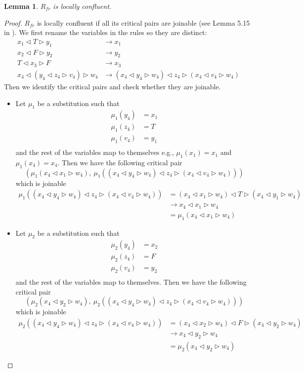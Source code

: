 \documentclass[a4paper,twoside,openright]{report}
\newcommand{\lef}{\ensuremath{\triangleleft}}
\newcommand{\rig}{\ensuremath{\triangleright}}
\newtheorem{lem}[theorem]{Lemma}
\begin{document}
\begin{lem}
$R_{fr}$ is locally confluent.
\end{lem}
\begin{proof}
$R_{fr}$ is locally confluent if all its critical pairs are joinable (see Lemma 5.15 in \cite{rewriting}). We first rename the variables in the rules so they are distinct:
\begin{align*}
x_1\lef T\rig y_1 &\to x_1\\
x_2\lef F\rig y_2 &\to y_2\\
T\lef x_3\rig F &\to x_3\\
x_4\lef(y_4\lef z_4\rig v_4)\rig w_4 &\to (x_4\lef y_4\rig w_4)\lef z_4\rig(x_4\lef v_4\rig w_4)
\end{align*}
Then we identify the critical pairs and check whether they are joinable.

\begin{itemize}

\item Let $\mu_1$ be a substitution such that
\begin{align*}
\mu_1(y_4) &= x_1\\
\mu_1(z_4) &= T\\
\mu_1(v_4) &= y_1\\
\end{align*}
and the rest of the variables map to themselves e.g., $\mu_1(x_1)=x_1$ and $\mu_1(x_4)=x_4$. Then we have the following critical pair
\[
(\mu_1(x_4\lef x_1\rig w_4),~ \mu_1((x_4\lef y_4\rig w_4)\lef z_4\rig(x_4\lef v_4\rig w_4)))
\]
which is joinable
\begin{align*}
\mu_1((x_4\lef y_4\rig w_4)\lef z_4\rig(x_4\lef v_4\rig w_4))
&=(x_4\lef x_1\rig w_4)\lef T\rig (x_4\lef y_1\rig w_4)\\
&\to x_4\lef x_1\rig w_4\\
&= \mu_1(x_4\lef x_1\rig w_4)
\end{align*}

\item Let $\mu_2$ be a substitution such that
\begin{align*}
\mu_2(y_4) &= x_2\\
\mu_2(z_4) &= F\\
\mu_2(v_4) &= y_2\\
\end{align*}
and the rest of the variables map to themselves. Then we have the following critical pair
\[
(\mu_2(x_4\lef y_2\rig w_4),~ \mu_2((x_4\lef y_4\rig w_4)\lef z_4\rig(x_4\lef v_4\rig w_4)))
\]
which is joinable
\begin{align*}
\mu_2((x_4\lef y_4\rig w_4)\lef z_4\rig(x_4\lef v_4\rig w_4))
&=(x_4\lef x_2\rig w_4)\lef F\rig (x_4\lef y_2\rig w_4)\\
&\to x_4\lef y_2\rig w_4\\
&= \mu_2(x_4\lef y_2\rig w_4)
\end{align*}


\end{itemize}
\end{proof}
\end{document}
